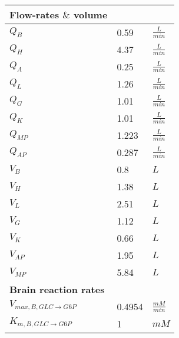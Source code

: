


\begin{supertabular}{lll}
\textbf{Flow-rates $\&$ volume} \\ \hline
$Q_B$         & 0.59      & $\frac{L}{min}$   \\ \hline
$Q_H$         & 4.37      & $\frac{L}{min}$   \\ \hline
$Q_A$         & 0.25      & $\frac{L}{min}$   \\ \hline
$Q_L$         & 1.26      & $\frac{L}{min}$   \\ \hline
$Q_G$         & 1.01      & $\frac{L}{min}$   \\ \hline
$Q_K$         & 1.01      & $\frac{L}{min}$   \\ \hline
$Q_{MP}$      & 1.223     & $\frac{L}{min}$   \\ \hline
$Q_{AP}$      & 0.287     & $\frac{L}{min}$   \\ \hline

$V_{B}$       & 0.8       & $L$       \\ \hline
$V_H$         & 1.38      & $L$       \\ \hline
$V_L$         & 2.51      & $L$       \\ \hline
$V_G$         & 1.12      & $L$       \\ \hline
$V_K$         & 0.66      & $L$       \\ \hline
$V_{AP}$      & 1.95      & $L$       \\ \hline
$V_{MP}$      & 5.84      & $L$       \\ \hline

\textbf{Brain reaction rates} \\ \hline

$V_{max, B, GLC \xrightarrow[]{} G6P}$ & 0.4954 & $\frac{mM}{min}$       \\ \hline
$K_{m, B,GLC \xrightarrow[]{} G6P}$ & 1 & $mM$   \\ \hline



\end{supertabular}
